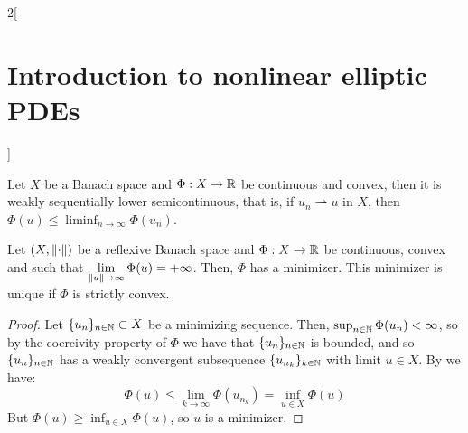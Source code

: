 \documentclass[../../../main_math.tex]{subfiles}
\begin{document}
\begin{multicols}{2}[\section{Introduction to nonlinear elliptic PDEs}]
  \begin{lemma}\label{INEPDE:optimization}
    Let $X$ be a Banach space and $\Phi:X\to \mathbb{R}$ be continuous and convex, then it is weakly sequentially lower semicontinuous, that is, if $u_n\rightharpoonup u$ in $X$, then $\displaystyle\Phi(u)\leq \liminf_{n\to\infty}\Phi(u_n)$.
  \end{lemma}
  \begin{theorem}
    Let $(X,\left\|\cdot\right\|)$ be a reflexive Banach space and $\Phi:X\to \mathbb{R}$ be continuous, convex and such that $\displaystyle \lim_{\left\|u\right\|\to\infty}\Phi(u)=+\infty$. Then, $\Phi$ has a minimizer. This minimizer is unique if $\Phi$ is strictly convex.
  \end{theorem}
  \begin{proof}
    Let $\{u_n\}_{n\in\mathbb{N}}\subset X$ be a minimizing sequence. Then, $\sup_{n\in\mathbb{N}}\Phi(u_n)<\infty$, so by the coercivity property of $\Phi$ we have that $\{u_n\}_{n\in\mathbb{N}}$ is bounded, and so $\{u_n\}_{n\in\mathbb{N}}$ has a weakly convergent subsequence $\{u_{n_k}\}_{k\in\mathbb{N}}$ with limit $u\in X$. By  we have:
    $$
      \Phi(u)\leq \lim_{k\to\infty}\Phi(u_{n_k})=\inf_{u\in X}\Phi(u)
    $$
    But $\Phi(u)\geq \inf_{u\in X}\Phi(u)$, so $u$ is a minimizer.
  \end{proof}
\end{multicols}
\end{document}
